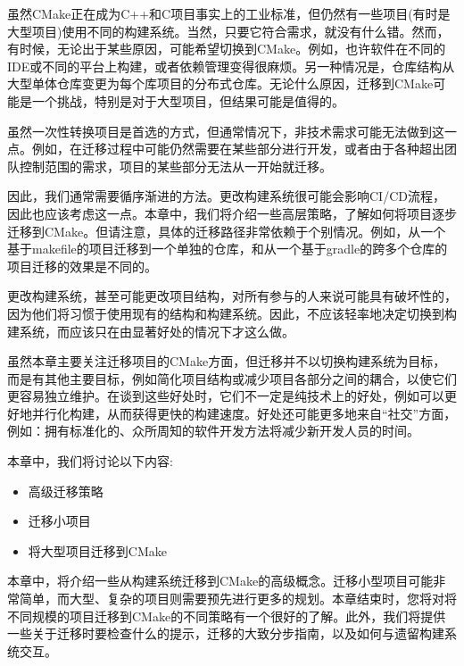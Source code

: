 虽然CMake正在成为C++和C项目事实上的工业标准，但仍然有一些项目(有时是大型项目)使用不同的构建系统。当然，只要它符合需求，就没有什么错。然而，有时候，无论出于某些原因，可能希望切换到CMake。例如，也许软件在不同的IDE或不同的平台上构建，或者依赖管理变得很麻烦。另一种情况是，仓库结构从大型单体仓库变更为每个库项目的分布式仓库。无论什么原因，迁移到CMake可能是一个挑战，特别是对于大型项目，但结果可能是值得的。

虽然一次性转换项目是首选的方式，但通常情况下，非技术需求可能无法做到这一点。例如，在迁移过程中可能仍然需要在某些部分进行开发，或者由于各种超出团队控制范围的需求，项目的某些部分无法从一开始就迁移。

因此，我们通常需要循序渐进的方法。更改构建系统很可能会影响CI/CD流程，因此也应该考虑这一点。本章中，我们将介绍一些高层策略，了解如何将项目逐步迁移到CMake。但请注意，具体的迁移路径非常依赖于个别情况。例如，从一个基于makefile的项目迁移到一个单独的仓库，和从一个基于gradle的跨多个仓库的项目迁移的效果是不同的。

更改构建系统，甚至可能更改项目结构，对所有参与的人来说可能具有破坏性的，因为他们将习惯于使用现有的结构和构建系统。因此，不应该轻率地决定切换到构建系统，而应该只在由显著好处的情况下才这么做。

虽然本章主要关注迁移项目的CMake方面，但迁移并不以切换构建系统为目标，而是有其他主要目标，例如简化项目结构或减少项目各部分之间的耦合，以使它们更容易独立维护。在谈到这些好处时，它们不一定是纯技术上的好处，例如可以更好地并行化构建，从而获得更快的构建速度。好处还可能更多地来自“社交”方面，例如：拥有标准化的、众所周知的软件开发方法将减少新开发人员的时间。

本章中，我们将讨论以下内容:

\begin{itemize}
\item 
高级迁移策略

\item 
迁移小项目

\item 
将大型项目迁移到CMake
\end{itemize}

本章中，将介绍一些从构建系统迁移到CMake的高级概念。迁移小型项目可能非常简单，而大型、复杂的项目则需要预先进行更多的规划。本章结束时，您将对将不同规模的项目迁移到CMake的不同策略有一个很好的了解。此外，我们将提供一些关于迁移时要检查什么的提示，迁移的大致分步指南，以及如何与遗留构建系统交互。